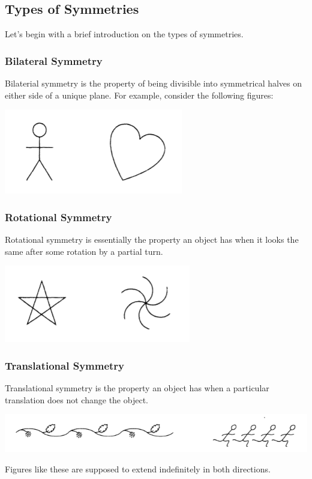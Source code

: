 \documentclass[letterpaper]{article}
\begin{document}
\subsection{Types of Symmetries}
Let's begin with a brief introduction on the types of symmetries. 

\subsubsection{Bilateral Symmetry}
Bilaterial symmetry is the property of being divisible into symmetrical halves on either side of a unique plane. For example, consider the following figures: 
\begin{center}
    \includegraphics[scale=0.8]{assets/bilaterial_sym.png}
\end{center}

\subsubsection{Rotational Symmetry}
Rotational symmetry is essentially the property an object has when it looks the same after some rotation by a partial turn.  
\begin{center}
    \includegraphics[scale=0.8]{assets/rotational_sym.png}
\end{center}

\subsubsection{Translational Symmetry}
Translational symmetry is the property an object has when a particular translation does not change the object. 
\begin{center}
    \includegraphics[scale=0.8]{assets/translational_sym.png}
\end{center}
Figures like these are supposed to extend indefinitely in both directions.
\end{document}
